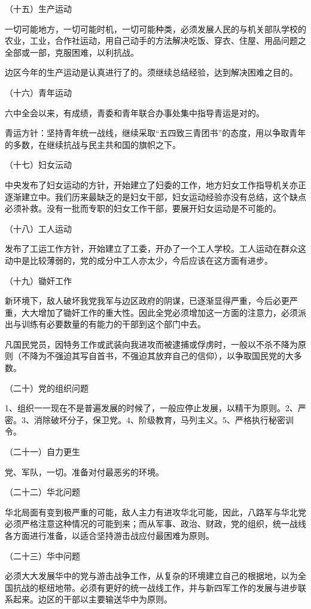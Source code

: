 （十五）生产运动

一切可能地方，一切可能时机，一切可能种类，必须发展人民的与机关部队学校的农业，工业，合作社运动，用自己动手的方法解决吃饭、穿衣、住屋、用品问题之全部或一部，克服困难，以利抗战。

边区今年的生产运动是认真进行了的。须继续总结经验，达到解决困难之目的。

（十六）青年运动

六中全会以来，有成绩，青委和青年联合办事处集中指导青运是对的。

青运方针：坚持青年统一战线，继续采取“五四致三青团书”的态度，用以争取青年的多数，在继续抗战与民主共和国的旗帜之下。

（十七）妇女沄动

中央发布了妇女运动的方针，开始建立了妇委的工作，地方妇女工作指导机关亦正逐渐建立中。我们历来最缺乏的是妇女干部，妇女运动经验亦没有总结，这个缺点必须补救。没有一批而专职的妇女工作干部，要展开妇女运动是不可能的。

（十八）工人运动

发布了工运工作方针，开始建立了工委，开办了一个工人学校。工人运动在群众这动中是比较薄弱的，党的成分中工人亦太少，今后应该在这方面有进步。

（十九）锄奸工作

新环境下，敌人破坏我党我军与边区政府的阴谋，已逐渐显得严重，今后必更严重，大大增加了锄奸工作的重大性。因此全党必须增加这一方面的注意力，必须派出与训练有必要数量的有能力的干部到这个部门中去。

凡国民党员，因特务工作或武装向我进攻而被逮捕或俘虏时，一般以不杀不降为原则（不降为不强迫其写自首书，不强迫其放弃自己的信仰），以争取国民党的大多数。

（二十）党的组织问题

1、组织一一现在不是普遍发展的时候了，一般应停止发展，以精干为原则。2、严密。3、消除破坏分子，保卫党。4、阶级教育，马列主义。5、严格执行秘密训令。

（二十一）自力更生

党、军队，一切。准备对付最恶劣的环境。

（二十二）华北问题

华北局面有变到极严重的可能，敌人主力有进攻华北可能，因此，八路军与华北党必须严格注意这种情况的可能到来；而从军事、政治、财政，党的组织，统一战线各方面进行准备，以适合坚持游击战应付最困难为原则。

（二十三）华中问题

必须大大发展华中的党与游击战争工作，从复杂的环境建立自己的根据地，以为全国抗战的枢纽地带。必须有更好的统一战线工作，并与新四军工作的发展与进步联系起来。边区的干部以主要输送华中为原则。

